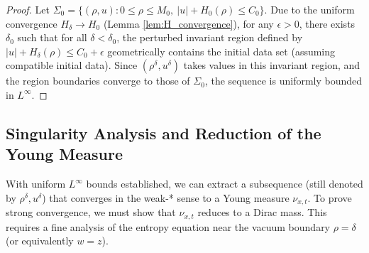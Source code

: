 \documentclass[12pt, reqno]{article}
\theoremstyle{definition}
\numberwithin{equation}{section}
\begin{document}
\begin{proof}
Let $\Sigma_0 = \{ (\rho, u) : 0 \le \rho \le M_0, \ |u| + H_0(\rho) \le C_0 \}$.
Due to the uniform convergence $H_\delta \to H_0$ (Lemma \ref{lem:H_convergence}), for any $\epsilon > 0$, there exists $\delta_0$ such that for all $\delta < \delta_0$, the perturbed invariant region defined by $|u| + H_\delta(\rho) \le C_0 + \epsilon$ geometrically contains the initial data set (assuming compatible initial data).
Since $(\rho^\delta, u^\delta)$ takes values in this invariant region, and the region boundaries converge to those of $\Sigma_0$, the sequence is uniformly bounded in $L^\infty$.
\end{proof}

\subsection{Singularity Analysis and Reduction of the Young Measure}
\label{sec:singularity_reduction}

With uniform $L^\infty$ bounds established, we can extract a subsequence (still denoted by $\rho^\delta, u^\delta$) that converges in the weak-* sense to a Young measure $\nu_{x,t}$. To prove strong convergence, we must show that $\nu_{x,t}$ reduces to a Dirac mass. This requires a fine analysis of the entropy equation near the vacuum boundary $\rho = \delta$ (or equivalently $w=z$).
\end{document}
